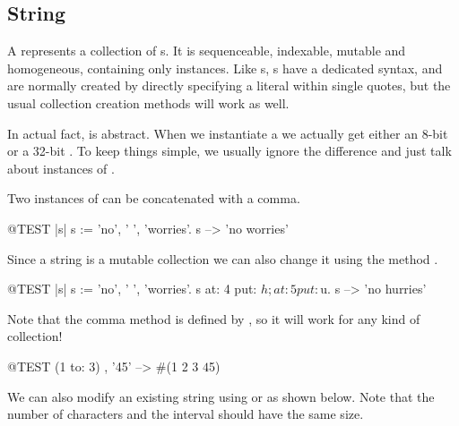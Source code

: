 \documentclass[a4paper,10pt,twoside]{book}
\begin{document}
\subsection{String}
A \st {} represents a collection of s.
It is sequenceable, indexable, mutable and homogeneous, containing only  instances.
Like s, s have a dedicated syntax, and are normally created by directly specifying a  literal within single quotes, but the usual collection creation methods will work as well.


In actual fact,  is abstract.
When we instantiate a  we actually get either an 8-bit  or a 32-bit .
To keep things simple, we usually ignore the difference and just talk about instances of .

Two instances of  can be concatenated with a comma.
\begin{code}{@TEST |s|}
s := 'no', ' ', 'worries'.
s -->  'no worries'
\end{code}

Since a string is a mutable collection we can also change it using the method .

\begin{code}{@TEST |s| s := 'no', ' ', 'worries'.}
s at: 4 put: $h; at: 5 put: $u.
s --> 'no hurries'
\end{code}

Note that the comma method is defined by , so it will work for any kind of collection!
\begin{code}{@TEST}
(1 to: 3) , '45' --> #(1 2 3 $4 $5)
\end{code}

We can also modify an existing string using  or  as shown below. Note that the number of characters and the interval should have the same size.
\end{document}
